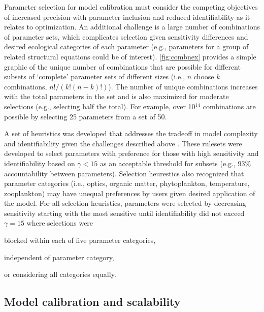 \documentclass[preprint]{elsarticle}\usepackage[]{graphicx}\usepackage[]{color}
\begin{document}
Parameter selection for model calibration must consider the competing objectives of increased precision with parameter inclusion and reduced identifiability as it relates to optimization.  An additional challenge is a large number of combinations of parameter sets, which complicates selection given sensitivity differences and desired ecological categories of each parameter (e.g., parameters for a group of related structural equations could be of interest).  \cref{fig:combnex} provides a simple graphic of the unique number of combinations that are possible for different subsets of `complete' parameter sets of different sizes (i.e., $n$ choose $k$ combinations, $n!/\left(k!\left(n-k\right)!\right)$).  The number of unique combinations increases with the total parameters in the set and is also maximized for moderate selections (e.g., selecting half the total).  For example, over 10$^{14}$ combinations are possible by selecting 25 parameters from a set of 50.

A set of heuristics was developed that addresses the tradeoff in model complexity and identifiability given the challenges described above \citep[see also][]{Wagener01}.  These rulesets were developed to select parameters with preference for those with high sensitivity and identifiability based on $\gamma < 15$ as an acceptable threshold for subsets (e.g., 93\% accountability between parameters).  Selection heurestics also recognized that parameter categories (i.e., optics, organic matter, phytoplankton, temperature, zooplankton) may have unequal preferences by users given desired application of the model.  For all selection heuristics, parameters were selected by decreasing sensitivity starting with the most sensitive until identifiability did not exceed $\gamma = 15$ where selections were \begin{inparaenum}[1\upshape)]
\item blocked within each of five parameter categories,
\item independent of parameter category,
\item or considering all categories equally.
\end{inparaenum}

\subsection{Model calibration and scalability}
\end{document}
